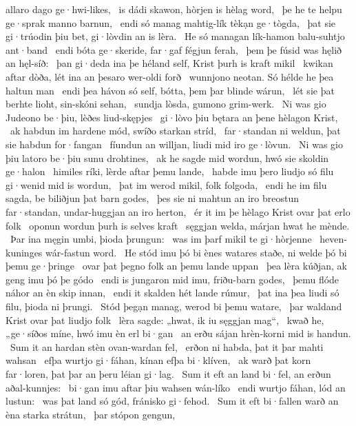 allaro dago ge·hwi-likes, \hld\ is dádi skawon,
hòrjen is hèlag word, \hld\ þe he te helpu ge·sprak
manno barnun, \hld\ endi só manag mahtig-lík
tèkạn ge·tògda, \hld\ þat sie gi·trúodin þiu bet,
gi·lòvdin an is lèra. \hld\ He só managan lík-hamon
balu-suhtjo ant·band \hld\ endi bóta ge·skeride,
far·gaf fégjun ferah, \hld\ þem þe fúsid was
hęlið an hęl-síð: \hld\ þan gi·deda ina þe héland self,
Krist þurh is kraft mikil \hld\ kwikan aftar dòða,
lét ina an þesaro wer-oldi forð \hld\ wunnjono neotan.
Só hélde he þea haltun man \hld\ endi þea hávon só self,
bótta, þem þar blinde wárun, \hld\ lét sie þat berhte lioht,
sin-skóni sehan, \hld\ sundja lòsda,
gumono grim-werk. \hld\ Ni was gio Judeono be·þiu,
lèðes liud-skępjes \hld\ gi·lòvo þiu bętara
an þene hèlagon Krist, \hld\ ak habdun im hardene mód,
swíðo starkan stríd, \hld\ far·standan ni weldun,
þat sie habdun for·fangan \hld\ fíundun an willjan,
liudi mid iro ge·lòvun. \hld\ Ni was gio þiu latoro be·þiu
sunu drohtines, \hld\ ak he sagde mid wordun,
hwó sie skoldin ge·halon \hld\ himiles ríki,
lèrde aftar þemu lande, \hld\ habde imu þero liudjo só filu
gi·wenid mid is wordun, \hld\ þat im werod mikil,
folk folgoda, \hld\ endi he im filu sagda,
be biliðjun þat barn godes, \hld\ þes sie ni mahtun an iro breostun far·standan,
undar-huggjan an iro herton, \hld\ ér it im þe hèlago Krist
ovar þat erlo folk \hld\ oponun wordun
þurh is selves kraft \hld\ sęggjan welda,
márjan hwat he mènde. \hld\ Þar ina męgin umbi,
þioda þrungun: \hld\ was im þarf mikil
te gi·hòrjenne \hld\ heven-kuninges
wár-fastun word. \hld\ He stód imu þó bi ènes watares staðe,
ni welde þó bi þemu ge·þringe \hld\ ovar þat þegno folk
an þemu lande uppan \hld\ þea lèra kúðjan,
ak geng imu þó þe gódo \hld\ endi is jungaron mid imu,
friðu-barn godes, \hld\ þemu flóde náhor
an èn skip innan, \hld\ endi it skalden hét
lande rúmur, \hld\ þat ina þea liudi só filu,
þioda ni þrungi. \hld\ Stód þegạn manag,
werod bi þemu watare, \hld\ þar waldand Krist
ovar þat liudjo folk \hld\ lèra sagde:
„hwat, ik iu sęggjan mag“, \hld\ kwað he, „ge·síðos míne,
hwó imu èn erl bi·gan \hld\ an erðu sájan
hrèn-korni mid is handun. \hld\ Sum it an hardan stèn
ovan-wardan fel, \hld\ erðon ni habda,
þat it þar mahti wahsan \hld\ efþa wurtjo gi·fáhan,
kínan efþa bi·klíven, \hld\ ak warð þat korn far·loren,
þat þar an þeru léian gi·lag. \hld\ Sum it eft an land bi·fel,
an erðun aðal-kunnjes: \hld\ bi·gan imu aftar þiu
wahsen wán-líko \hld\ endi wurtjo fáhan,
lód an lustun: \hld\ was þat land só gód,
fránisko gi·fehod. \hld\ Sum it eft bi·fallen warð
an èna starka strátun, \hld\ þar stópon gengun,
